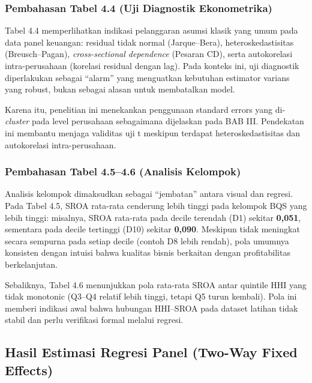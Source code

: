 \documentclass[12pt,a4paper]{report}
\begin{document}
\hypertarget{pembahasan-tabel-4.4-uji-diagnostik-ekonometrika}{%
\subsubsection{Pembahasan Tabel 4.4 (Uji Diagnostik
Ekonometrika)}\label{pembahasan-tabel-4.4-uji-diagnostik-ekonometrika}}

Tabel 4.4 memperlihatkan indikasi pelanggaran asumsi klasik yang umum
pada data panel keuangan: residual tidak normal (Jarque--Bera),
heteroskedastisitas (Breusch--Pagan), \emph{cross-sectional dependence}
(Pesaran CD), serta autokorelasi intra-perusahaan (korelasi residual
dengan lag). Pada konteks ini, uji diagnostik diperlakukan sebagai
``alarm'' yang menguatkan kebutuhan estimator varians yang robust, bukan
sebagai alasan untuk membatalkan model.

Karena itu, penelitian ini menekankan penggunaan standard errors yang
di-\emph{cluster} pada level perusahaan sebagaimana dijelaskan pada BAB
III. Pendekatan ini membantu menjaga validitas uji t meskipun terdapat
heteroskedastisitas dan autokorelasi intra-perusahaan.

\hypertarget{pembahasan-tabel-4.54.6-analisis-kelompok}{%
\subsubsection{Pembahasan Tabel 4.5--4.6 (Analisis
Kelompok)}\label{pembahasan-tabel-4.54.6-analisis-kelompok}}

Analisis kelompok dimaksudkan sebagai ``jembatan'' antara visual dan
regresi. Pada Tabel 4.5, SROA rata-rata cenderung lebih tinggi pada
kelompok BQS yang lebih tinggi: misalnya, SROA rata-rata pada decile
terendah (D1) sekitar \textbf{0,051}, sementara pada decile tertinggi
(D10) sekitar \textbf{0,090}. Meskipun tidak meningkat secara sempurna
pada setiap decile (contoh D8 lebih rendah), pola umumnya konsisten
dengan intuisi bahwa kualitas bisnis berkaitan dengan profitabilitas
berkelanjutan.

Sebaliknya, Tabel 4.6 menunjukkan pola rata-rata SROA antar quintile HHI
yang tidak monotonic (Q3--Q4 relatif lebih tinggi, tetapi Q5 turun
kembali). Pola ini memberi indikasi awal bahwa hubungan HHI--SROA pada
dataset latihan tidak stabil dan perlu verifikasi formal melalui
regresi.

\hypertarget{hasil-estimasi-regresi-panel-two-way-fixed-effects}{%
\subsection{Hasil Estimasi Regresi Panel (Two-Way Fixed
Effects)}\label{hasil-estimasi-regresi-panel-two-way-fixed-effects}}
\end{document}
